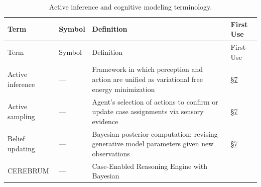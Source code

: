 \documentclass[
]{article}
\begin{document}
\begin{longtable}[]{@{}
  >{\raggedright\arraybackslash}p{}
  >{\centering\arraybackslash}p{}
  >{\raggedright\arraybackslash}p{}
  >{\centering\arraybackslash}p{}@{}}
\caption{Active inference and cognitive modeling
terminology.}\label{tbl:not-cognitive}\tabularnewline
\toprule\noalign{}
\begin{minipage}[b]{\linewidth}\raggedright
Term
\end{minipage} & \begin{minipage}[b]{\linewidth}\centering
Symbol
\end{minipage} & \begin{minipage}[b]{\linewidth}\raggedright
Definition
\end{minipage} & \begin{minipage}[b]{\linewidth}\centering
First Use
\end{minipage} \\
\midrule\noalign{}
\endfirsthead
\toprule\noalign{}
\begin{minipage}[b]{\linewidth}\raggedright
Term
\end{minipage} & \begin{minipage}[b]{\linewidth}\centering
Symbol
\end{minipage} & \begin{minipage}[b]{\linewidth}\raggedright
Definition
\end{minipage} & \begin{minipage}[b]{\linewidth}\centering
First Use
\end{minipage} \\
\midrule\noalign{}
\endhead
\bottomrule\noalign{}
\endlastfoot
Active inference & --- & Framework in which perception and action are
unified as variational free energy minimization &
\href{07_cognitive_integration.md\#sec:cognitive-integration}{§7} \\
Active sampling & --- & Agent's selection of actions to confirm or
update case assignments via sensory evidence &
\href{07_cognitive_integration.md\#sec:cognitive-integration}{§7} \\
Belief updating & --- & Bayesian posterior computation: revising
generative model parameters given new observations &
\href{07_cognitive_integration.md\#sec:cognitive-integration}{§7} \\
CEREBRUM & --- & Case-Enabled Reasoning Engine with Bayesian

\end{longtable}
\end{document}
